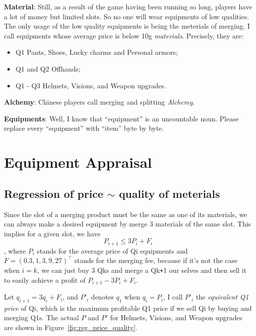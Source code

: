 \documentclass{manuscript}
\begin{document}
    \textbf{Material}: Still, as a result of the game having been running so long, players have a lot of money but limited
    slots. So no one will wear equipments of low qualities. The only usage of the low quality equipments is being the
    meterials of merging. I call equipments whose average price is below 10g \textit{materials}. Precisely, they are:
    \begin{itemize}[nosep]
        \item Q1 Pants, Shoes, Lucky charms and Personal armors;
        \item Q1 and Q2 Offhands;
        \item Q1 - Q3 Helmets, Visions, and Weapon upgrades.
    \end{itemize}

    \textbf{Alchemy}: Chinese players call merging and splitting \textit{Alchemy}.

    \textbf{Equipments}: Well, I know that ``equipment'' is an uncountable noun. Please replace every ``equipment''
    with ``item'' byte by byte.

    \section{Equipment Appraisal}

    \subsection{Regression of price $\sim$ quality of meterials}

    Since the slot of a merging product must be the same as one of its materials, we can always make a desired equipment
    by merge 3 materials of the same slot. This implies for a given slot, we have
        $$ P_{i+1} \leqslant 3P_{i} + F_{i} $$,
    where $P_i$ stands for the average price of Qi equipments and $F = (0.3, 1, 3, 9, 27)^\intercal$ stands for the merging
    fee, because if it's not the case when $i = k$, we can just buy 3 Qks and merge a Qk\verb!+!1 our selves and then sell
    it to easily achieve a profit of $P_{i+1} - 3P_{i} + F_{i}$.

    Let $q_{i+1} = 3q_{i} + F_{i}$, and $P'_i$ denotes $q_1$ when $q_i = P_i$, I call $P'_i$ the \textit{equivalent Q1 price}
    of Qi, which is the maximum profitable Q1 price if we sell Qi by buying and merging Q1s. The actual $P$ and $P'$
    for Helmets, Visions, and Weapon upgrades are shown in Figure~\ref{fig:reg_price_quality}.
\end{document}
